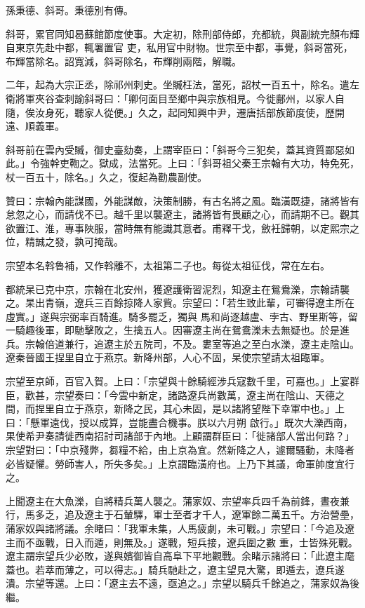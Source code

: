 \begin{pinyinscope}
 孫秉德、斜哥。秉德別有傳。



 斜哥，累官同知曷蘇館節度使事。大定初，除刑部侍郎，充都統，與副統完顏布輝自東京先赴中都，輒署置官
 吏，私用官中財物。世宗至中都，事覺，斜哥當死，布輝當除名。詔寬減，斜哥除名，布輝削兩階，解職。



 二年，起為大宗正丞，除祁州刺史。坐贓枉法，當死，詔杖一百五十，除名。遣左衛將軍夾谷查刺諭斜哥曰：「卿何面目至鄉中與宗族相見。今徙鄜州，以家人自隨，俟汝身死，聽家人從便。」久之，起同知興中尹，遷唐括部族節度使，歷開遠、順義軍。



 斜哥前在雲內受贓，御史臺劾奏，上謂宰臣曰：「斜哥今三犯矣，蓋其資質鄙惡如此。」令強幹吏鞫之。獄成，法當死。上曰：「斜哥祖父秦王宗翰有大功，特免死，杖一百五十，除名。」久之，復起為勸農副使。



 贊曰：宗翰內能謀國，外能謀敵，決策制勝，有古名將之風。臨潢既捷，諸將皆有怠忽之心，而請伐不已。越千里以襲遼主，諸將皆有畏顧之心，而請期不已。觀其欲置江、淮，專事陜服，當時無有能識其意者。甫釋干戈，斂衽歸朝，以定熙宗之位，精誠之發，孰可掩哉。



 宗望本名斡魯補，又作斡離不，太祖第二子也。每從太祖征伐，常在左右。



 都統杲已克中京，宗翰在北安州，獲遼護衛習泥烈，知遼主在鴛鴦濼，宗翰請襲之。杲出青嶺，遼兵三百餘掠降人家貲。宗望曰：「若生致此輩，可審得遼主所在虛實。」遂與宗弼率百騎進。騎多罷乏，獨與
 馬和尚逐越盧、孛古、野里斯等，留一騎趣後軍，即馳擊敗之，生擒五人。因審遼主尚在鴛鴦濼未去無疑也。於是進兵。宗翰倍道兼行，追遼主於五院司，不及。婁室等追之至白水濼，遼主走陰山。遼秦晉國王捏里自立于燕京。新降州部，人心不固，杲使宗望請太祖臨軍。



 宗望至京師，百官入賀。上曰：「宗望與十餘騎經涉兵寇數千里，可嘉也。」上宴群臣，歡甚，宗望奏曰：「今雲中新定，諸路遼兵尚數萬，遼主尚在陰山、天德之間，而捏里自立于燕京，新降之民，其心未固，是以諸將望陛下幸軍中也。」上曰：「懸軍遠伐，授以成算，豈能盡合機事。朕以六月朔
 啟行。」既次大濼西南，果使希尹奏請徙西南招討司諸部于內地。上顧謂群臣曰：「徙諸部人當出何路？」宗望對曰：「中京殘弊，芻糧不給，由上京為宜。然新降之人，遽爾騷動，未降者必皆疑懼。勞師害人，所失多矣。」上京謂臨潢府也。上乃下其議，命軍帥度宜行之。



 上聞遼主在大魚濼，自將精兵萬人襲之。蒲家奴、宗望率兵四千為前鋒，晝夜兼行，馬多乏，追及遼主于石輦驛，軍士至者才千人，遼軍餘二萬五千。方治營壘，蒲家奴與諸將議。余睹曰：「我軍未集，人馬疲劇，未可戰。」宗望曰：「今追及遼主而不亟戰，日入而遁，則無及。」遂戰，短兵接，遼兵圍之數
 重，士皆殊死戰。遼主謂宗望兵少必敗，遂與嬪御皆自高阜下平地觀戰。余睹示諸將曰：「此遼主麾蓋也。若萃而薄之，可以得志。」騎兵馳赴之，遼主望見大驚，即遁去，遼兵遂潰。宗望等還。上曰：「遼主去不遠，亟追之。」宗望以騎兵千餘追之，蒲家奴為後繼。




\end{pinyinscope}
